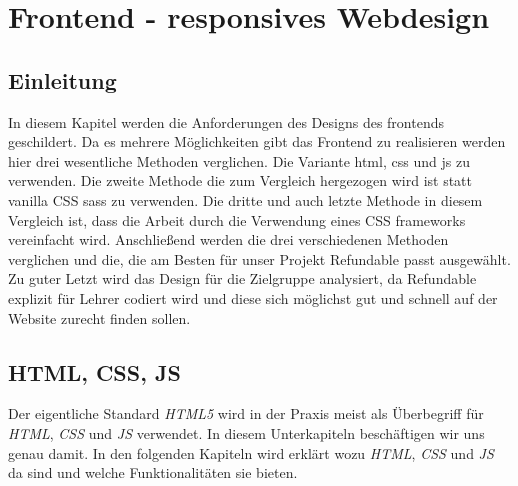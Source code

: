 \section{Frontend - responsives Webdesign}
	\subsection{Einleitung}
	In diesem Kapitel werden die Anforderungen des Designs des \Gls{frontend}s geschildert. Da es mehrere Möglichkeiten gibt das Frontend zu realisieren werden hier drei wesentliche Methoden verglichen. Die Variante \Gls{html}, \Gls{css} und \Gls{js} zu verwenden. Die zweite Methode die zum Vergleich hergezogen wird ist statt \Gls{vanilla} CSS \Gls{sass} zu verwenden. Die dritte und auch letzte Methode in diesem Vergleich ist, dass die Arbeit durch die Verwendung eines CSS \Gls{framework}s vereinfacht wird. Anschließend werden die drei verschiedenen Methoden verglichen und die, die am Besten für unser Projekt Refundable passt ausgewählt. Zu guter Letzt wird das Design für die Zielgruppe analysiert, da Refundable explizit für Lehrer codiert wird und diese sich möglichst gut und schnell auf der Website zurecht finden sollen.
	
	\subsection{HTML, CSS, JS}
	Der eigentliche Standard \textit{HTML5} wird in der Praxis meist als Überbegriff für \textit{HTML}, \textit{CSS} und \textit{JS} verwendet. In diesem Unterkapiteln beschäftigen wir uns genau damit.\cite{html5-css3-handbuch} In den folgenden Kapiteln wird erklärt wozu \textit{HTML}, \textit{CSS} und \textit{JS} da sind und welche Funktionalitäten sie bieten.
	
